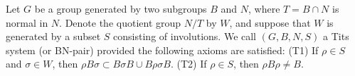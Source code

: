 Let $G$ be a group generated by two subgroups $B$ and $N$, where $T = B \cap N$ is normal in $N$. Denote the quotient group $N/T$ by $W$, and suppose that $W$ is generated by a subset $S$ consisting of involutions. We call $(G, B, N, S)$ a Tits system (or BN-pair) provided the following axioms are satisfied:
(T1) If $\rho \in S$ and $\sigma \in W$, then $\rho B\sigma \subset B\sigma B \cup B\rho\sigma B$.
(T2) If $\rho \in S$, then $\rho B\rho \neq B$.
